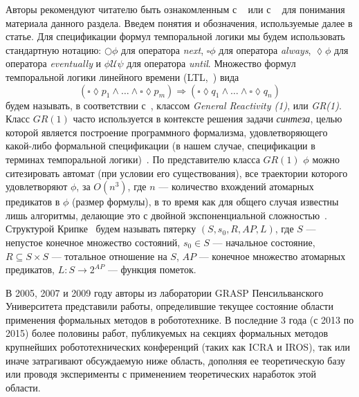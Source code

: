 \documentclass[conference]{IEEEtran}
\begin{document}
Авторы рекомендуют читателю быть ознакомленным с ~\cite{karpov2010model} или с ~\cite{clarke1999model}
для понимания материала данного раздела. Введем понятия и обозначения, используемые далее 
в статье. Для спецификации формул темпоральной логики мы будем использовать стандартную нотацию: 
$\bigcirc\phi$ для оператора \textit{next}, $\square\phi$ для оператора \textit{always}, 
$\lozenge\phi$ для оператора \textit{eventually} и $\phi\mathcal{U}\psi$ для оператора 
\textit{until}. Множество формул темпоральной логики линейного 
времени (LTL,~\cite{emerson1990temporal}) вида
$$(\square\lozenge{p_1}\wedge\dots\wedge\square\lozenge{p_m})\Rightarrow(\square\lozenge{q_1}\wedge\dots\wedge\square\lozenge{q_n})$$
будем называть, в соответствии с~\cite{piterman2006synthesis}, классом \textit{General 
Reactivity (1)}, или \textit{GR(1)}. Класс $GR(1)$ часто используется в контексте решения задачи 
\textit{синтеза}, целью которой является построение программного формализма, удовлетворяющего 
какой-либо формальной спецификации (в нашем случае, спецификации в терминах темпоральной логики)~\cite{pnueli1989synthesis}.
По представителю класса $GR(1)$ $\phi$ можно ситезировать автомат (при условии его 
существования), все траектории которого удовлетворяют $\phi$, за $O(n^3)$, где 
$n$ --- количество вхождений атомарных предикатов в $\phi$ (размер формулы), в то 
время как для общего случая известны лишь алгоритмы, делающие это с двойной 
экспоненциальной сложностью~\cite{pnueli1989synthesis}. Структурой 
Крипке~\cite{kripke1963semantical} будем называть пятерку $(S, s_0, R, AP, L)$, где $S$ 
--- непустое конечное множество состояний, $s_0 \in S$ --- начальное состояние, 
$R \subseteq S\times{S}$ --- тотальное отношение на $S$, $AP$ --- конечное 
множество атомарных предикатов, $L: S \rightarrow 2^{AP}$ --- функция пометок.

В 2005, 2007 и 2009 году авторы из лаборатории GRASP Пенсильванского Университета 
представили работы, определившие текущее состояние области применения формальных 
методов в робототехнике. В последние 3 года (с 2013 по 2015) более половины 
работ, публикуемых на секциях формальных методов крупнейших робототехнических 
конференций (таких как ICRA и IROS), так или иначе затрагивают обсуждаемую 
ниже область, дополняя ее теоретическую базу или проводя эксперименты 
с применением теоретических наработок этой области.
\end{document}
